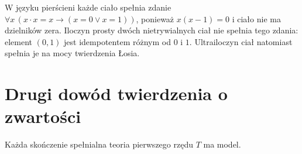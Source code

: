 \begin{przyklad}
\label{ex:mod-direct-product-not-elementary}
W języku pierścieni każde ciało spełnia zdanie
$\forall x\,(x\cdot x=x\to (x=0\lor x=1))$, ponieważ
$x(x-1)=0$ i ciało nie ma dzielników zera.
Iloczyn prosty dwóch nietrywialnych ciał nie spełnia tego zdania:
element $(0,1)$ jest idempotentem różnym od $0$ i $1$.
Ultrailoczyn ciał natomiast spełnia je na mocy twierdzenia Łosia.
\end{przyklad}

\section{Drugi dowód twierdzenia o zwartości}
\begin{twierdzenie}
\label{thm:mod-compactness-ultraproduct}
Każda skończenie spełnialna teoria pierwszego rzędu $T$ ma model.
\end{twierdzenie}
